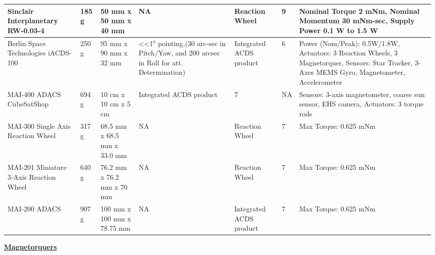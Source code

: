 \begin{center}
     \begin{tabular}{ | p{2cm} | p{1.25cm} | p{2cm} | p{2cm} | p{2cm} | p{1cm} | p{5cm} |}
	 \hline 
	   
Sinclair Interplanetary RW-0.03-4 \cite{Sinclair} & 185 g & 50 mm x 50 mm x 40 mm & NA & Reaction Wheel & 9 & Nominal Torque 2 mNm, Nominal Momentum 30 mNm-sec, Supply Power 0.1 W to 1.5 W \\ \hline
	   
Berlin Space Technologies iACDS-100 \cite{BST} & 250 g & 95 mm x 90 mm x 32 mm & <<1$^o$ pointing,(30 arc-sec in Pitch/Yaw, and 200 arcsec in Roll for att. Determination) & Integrated ACDS product & 6 & Power (Nom/Peak): 0.5W/1.8W, Actuators: 3 Reaction Wheels, 3 Magnetorquer, Sensors: Star Tracker, 3-Axes MEMS Gyro, Magnetometer, Accelerometer \\ \hline 
	   
MAI-400 ADACS CubeSatShop \cite{CubeShop} & 694 g & 10 cm x 10 cm x 5 cm	& Integrated ACDS product & 7 & NA & Sensors: 3-axis magnetometer, coarse sun sensor, EHS camera, Actuators: 3 torque rods  \\ \hline 
	   
MAI-300 Single Axis Reaction Wheel \cite{CubeShop} & 317 g & 68.5 mm x 68.5 mm x 33.0 mm & NA & Reaction Wheel & 7 & Max Torque: 0.625 mNm \\ \hline
	   
MAI-201 Miniature 3-Axis Reaction Wheel \cite{CubeShop} & 640 g & 76.2 mm x 76.2 mm x 70 mm & NA & Reaction Wheel & 7 & Max Torque: 0.625 mNm \\ \hline
	   
MAI-200 ADACS \cite{CubeShop} & 907 g & 100 mm x 100 mm x 78.75 mm & NA & Integrated ACDS product & 7 & Max Torque: 0.625 mNm \\ \hline
     \end{tabular}
\end{center}

{\bf \underline{Magnetorquers}}\\

